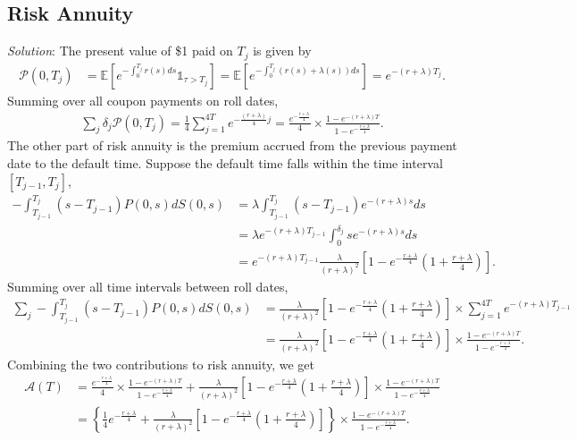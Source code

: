 \documentclass[paper=a4, fontsize=11pt]{scrartcl} %
\numberwithin{equation}{section} %
\numberwithin{figure}{section} %
\numberwithin{table}{section} %
\begin{document}
\subsection{Risk Annuity}
\textit{Solution}: The present value of \$1 paid on $T_j$ is given by
\begin{align}
\nonumber \mathcal{P}(0,T_j) &= \mathbb{E}\left[ e^{-\int_0^{T_j}r(s)ds}\mathbb{1}_{\tau>T_j} \right]
= \mathbb{E}\left[ e^{-\int_0^{T_j}\left(r(s)+\lambda(s)\right)ds}\right]
= e^{-(r+\lambda)T_j}.
\end{align}
Summing over all coupon payments on roll dates,
\begin{align}
\nonumber \sum_{j}\delta_j \mathcal{P}(0,T_j)
= \frac{1}{4}\sum_{j=1}^{4T} e^{-\frac{(r+\lambda)}{4}j}
= \frac{e^{-\frac{r+\lambda}{4}}}{4}\times\frac{1-e^{-(r+\lambda)T}}{1-e^{-\frac{r+\lambda}{4}}}.
\end{align}
The other part of risk annuity is the premium accrued from the previous payment date to the default time. Suppose the default time falls
within the time interval $[T_{j-1},T_j]$,
\begin{align}
\nonumber -\int_{T_{j-1}}^{T_j} (s-T_{j-1}) P(0,s)dS(0,s)
&= \lambda \int_{T_{j-1}}^{T_j} (s-T_{j-1}) e^{-(r+\lambda)s}ds \\
\nonumber &=\lambda e^{-(r+\lambda)T_{j-1}}\int_{0}^{\delta_j}s e^{-(r+\lambda)s}ds\\
\nonumber &=  e^{-(r+\lambda)T_{j-1}} \frac{\lambda}{(r+\lambda)^2}
\left[ 1 - e^{-\frac{r+\lambda}{4}} \left( 1+\frac{r+\lambda}{4} \right) \right].
\end{align}
Summing over all time intervals between roll dates,
\begin{align}
\nonumber \sum_{j}-\int_{T_{j-1}}^{T_j} (s-T_{j-1}) P(0,s)dS(0,s)
&= \frac{\lambda}{(r+\lambda)^2}
\left[ 1 - e^{-\frac{r+\lambda}{4}} \left( 1+\frac{r+\lambda}{4} \right) \right]\times\sum_{j=1}^{4T} e^{-(r+\lambda)T_{j-1}}\\
\nonumber &=\frac{\lambda}{(r+\lambda)^2}
\left[ 1 - e^{-\frac{r+\lambda}{4}} \left( 1+\frac{r+\lambda}{4} \right) \right]\times\frac{1-e^{-(r+\lambda)T}}{1-e^{-\frac{r+\lambda}{4}}}.
\end{align}
Combining the two contributions to risk annuity, we get
\begin{align}
\nonumber \mathcal{A}(T) &=
\frac{e^{-\frac{r+\lambda}{4}}}{4}\times\frac{1-e^{-(r+\lambda)T}}{1-e^{-\frac{r+\lambda}{4}}}
+ \frac{\lambda}{(r+\lambda)^2}
\left[ 1 - e^{-\frac{r+\lambda}{4}} \left( 1+\frac{r+\lambda}{4} \right) \right]\times\frac{1-e^{-(r+\lambda)T}}{1-e^{-\frac{r+\lambda}{4}}}\\
\nonumber &= \left\{ \frac{1}{4}e^{-\frac{r+\lambda}{4}} + \frac{\lambda}{(r+\lambda)^2}
\left[ 1 - e^{-\frac{r+\lambda}{4}} \left( 1+\frac{r+\lambda}{4} \right) \right]\right\}\times\frac{1-e^{-(r+\lambda)T}}{1-e^{-\frac{r+\lambda}{4}}}.
\end{align}\\
\end{document}
